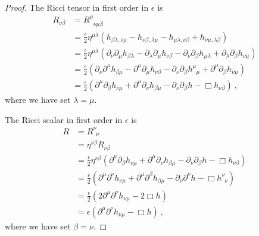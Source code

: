 \begin{proof}
        The Ricci tensor in first order in $\epsilon$ is 
        \begin{equation*}
        \begin{aligned}
            R_{\nu\beta} & = R^\mu_{\phantom \mu \nu\mu\beta} \\ & = \frac{\epsilon}{2} \eta^{\mu\lambda} ( h_{\beta\lambda,\nu\mu} - h_{\nu\beta,\lambda\mu} - h_{\mu\lambda,\nu\beta} + h_{\nu\mu,\lambda\beta}) \\ & = \frac{\epsilon}{2} \eta^{\mu\lambda} (\partial_\nu \partial_\mu h_{\beta\lambda} - \partial _\lambda \partial_\mu h_{\nu\beta} - \partial_\nu \partial_\beta h_{\mu\lambda} + \partial_\lambda \partial_\beta h_{\nu\mu}) \\ & = \frac{\epsilon}{2} (\partial_\nu \partial^\mu h_{\beta\mu} - \partial^\mu \partial_\mu h_{\nu\beta} - \partial_\nu \partial_\beta h^\mu_{\phantom \mu \mu} + \partial^\mu \partial_\beta h_{\nu\mu}) \\ & = \frac{\epsilon}{2} (  \partial^\mu \partial_\beta h_{\nu\mu} + \partial^\mu \partial_\nu h_{\beta\mu} - \partial_\nu \partial_\beta h - \Box h_{\nu\beta} ) ~,
        \end{aligned}
        \end{equation*}
        where we have set $\lambda = \mu$.

        The Ricci scalar in first order in $\epsilon$ is 
        \begin{equation*}
        \begin{aligned}
            R & = R^\nu_{\phantom \nu \nu} \\ & = \eta^{\nu \beta} R_{\nu \beta} \\ & = \frac{\epsilon}{2} \eta^{\nu \beta} ( \partial^\mu \partial_\beta h_{\nu\mu} + \partial^\mu \partial_\nu h_{\beta\mu} - \partial_\nu \partial_\beta h - \Box h_{\nu\beta}) \\ & = \frac{\epsilon}{2} ( \partial^\mu \partial^\nu h_{\nu\mu} + \partial^\mu \partial^\beta h_{\beta\mu} - \partial_\nu \partial^\nu h - \Box h^\nu_{\phantom \nu \nu}) \\ & = \frac{\epsilon}{2} (2 \partial^\mu \partial^\nu h_{\nu\mu} - 2 \Box h) \\ & = \epsilon (\partial^\mu \partial^\nu h_{\nu\mu}- \Box h) ~,
        \end{aligned}
        \end{equation*}
        where we have set $\beta = \nu$.


\end{proof}
